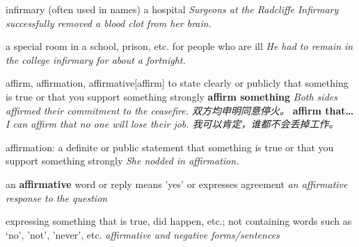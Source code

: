 \begin{DefWord}{infirmary}
    (often used in names) a hospital
    \textit{Surgeons at the Radcliffe Infirmary successfully removed a blood clot from her brain.}

    a special room in a school, prison, etc. for people who are ill
    \textit{He had to remain in the college infirmary for about a fortnight.}
\end{DefWord}

\begin{DefWord}{affirm, affirmation, affirmative}[affirm]
    to state clearly or publicly that something is true or that you support something strongly
    \textbf{affirm something} \textit{Both sides affirmed their commitment to the ceasefire. 双方均申明同意停火。}
    \textbf{affirm that…} \textit{I can affirm that no one will lose their job. 我可以肯定，谁都不会丢掉工作。}

    affirmation: a definite or public statement that something is true or that you support something strongly
    \textit{She nodded in affirmation.}

    an \textbf{affirmative} word or reply means 'yes' or expresses agreement
    \textit{an affirmative response to the question}

    expressing something that is true, did happen, etc.; not containing words such as `no', 'not', 'never', etc.
    \textit{affirmative and negative forms/sentences}
\end{DefWord}

